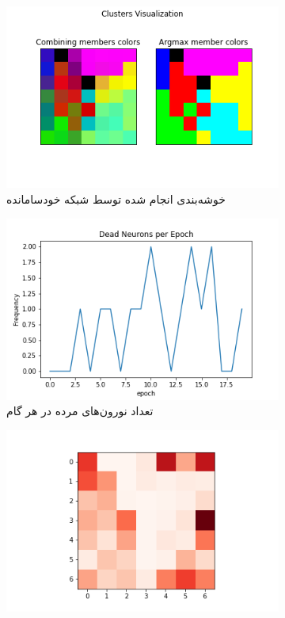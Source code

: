 \documentclass[12pt, a4paper]{article}
\begin{document}
\clearpage

\begin{figure}[h]
    \begin{subfigure}{\linewidth}
        \centering
        \includegraphics[width=0.8\linewidth]{images/q5/r6/cluster.png}
        \caption{خوشه‌بندی انجام شده توسط شبکه خودسامانده}
    \end{subfigure}
    \newline
    \begin{subfigure}{0.45\linewidth}
        \includegraphics[width=\linewidth]{images/q5/r6/dead.png}
        \caption{تعداد نورون‌های مرده در هر گام}
    \end{subfigure}
    \hfill
    \begin{subfigure}{0.45\linewidth}
        \includegraphics[width=\linewidth]{images/q5/r6/umatrix.png}

\end{subfigure}
\end{figure}
\end{document}

